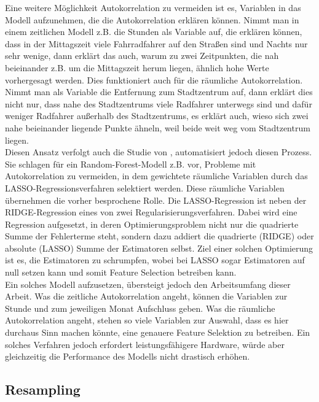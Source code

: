 \documentclass[a4paper,12pt]{thesis}
\begin{document}
Eine weitere Möglichkeit Autokorrelation zu vermeiden ist es, Variablen in das Modell aufzunehmen, die die Autokorrelation erklären können. Nimmt man in einem zeitlichen Modell z.B. die Stunden als Variable auf, die erklären können, dass in der Mittagszeit viele Fahrradfahrer auf den Straßen sind und Nachts nur sehr wenige, dann erklärt das auch, warum zu zwei Zeitpunkten, die nah beieinander z.B. um die Mittagszeit herum liegen, ähnlich hohe Werte vorhergesagt werden. Dies funktioniert auch für die räumliche Autokorrelation. Nimmt man als Variable die Entfernung zum Stadtzentrum auf, dann erklärt dies nicht nur, dass nahe des Stadtzentrums viele Radfahrer unterwegs sind und dafür weniger Radfahrer außerhalb des Stadtzentrums, es erklärt auch, wieso sich zwei nahe beieinander liegende Punkte ähneln, weil beide weit weg vom Stadtzentrum liegen.\\
Diesen Ansatz verfolgt auch die Studie von \cite{LiuAutocorrelation2022}, automatisiert jedoch diesen Prozess. Sie schlagen für ein Random-Forest-Modell z.B. vor, Probleme mit Autokorrelation zu vermeiden, in dem gewichtete räumliche Variablen durch das LASSO-Regressionsverfahren selektiert werden. Diese räumliche Variablen übernehmen die vorher besprochene Rolle. Die LASSO-Regression ist neben der RIDGE-Regression eines von zwei Regularisierungsverfahren. Dabei wird eine Regression aufgesetzt, in deren Optimierungsproblem nicht nur die quadrierte Summe der Fehlerterme steht, sondern dazu addiert die quadrierte (RIDGE) oder absolute (LASSO) Summe der Estimatoren selbst. Ziel einer solchen Optimierung ist es, die Estimatoren zu schrumpfen, wobei bei LASSO sogar Estimatoren auf null setzen kann und somit Feature Selection betreiben kann.\\
Ein solches Modell aufzusetzen, übersteigt jedoch den Arbeitsumfang dieser Arbeit. Was die zeitliche Autokorrelation angeht, können die Variablen zur Stunde und zum jeweiligen Monat Aufschluss geben. Was die räumliche Autokorrelation angeht, stehen so viele Variablen zur Auswahl, dass es hier durchaus Sinn machen könnte, eine genauere Feature Selektion zu betreiben. Ein solches Verfahren jedoch erfordert leistungsfähigere Hardware, würde aber gleichzeitig die Performance des Modells nicht drastisch erhöhen.

\subsection{Resampling}
\end{document}
